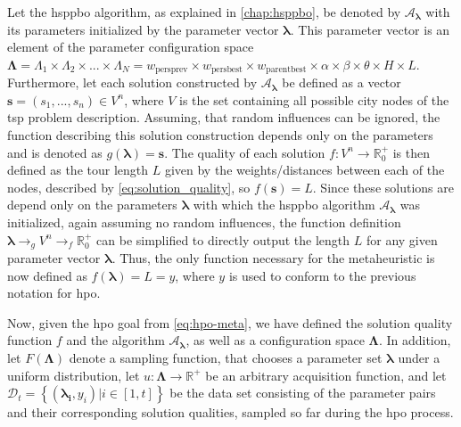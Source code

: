 Let the \gls{hsppbo} algorithm, as explained in \cref{chap:hsppbo}, be denoted by $\mathcal{A}_\mathbf{\lambda}$ with its parameters initialized by the parameter vector $\mathbf{\lambda}$. This parameter vector is an element of the parameter configuration space $\mathbf{\Lambda} = \Lambda_1 \times \Lambda_2 \times ... \times \Lambda_N = w_{\text{persprev}} \times w_{\text{persbest}} \times w_{\text{parentbest}} \times \alpha \times \beta \times \theta \times H \times L$. Furthermore, let each solution constructed by $\mathcal{A}_\mathbf{\lambda}$ be defined as a vector $\mathbf{s} = (s_1,...,s_n) \in V^n$, where $V$ is the set containing all possible city nodes of the \gls{tsp} problem description. Assuming, that random influences can be ignored, the function describing this solution construction depends only on the parameters and is denoted as $g(\mathbf{\lambda}) = \mathbf{s}$. The quality of each solution $f : V^n \rightarrow \mathbb{R}_{0}^{+}$ is then defined as the tour length $L$ given by the weights/distances between each of the nodes, described by \cref{eq:solution_quality}, so $f(\mathbf{s}) = L$. Since these solutions are depend only on the parameters $\mathbf{\lambda}$ with which the \gls{hsppbo} algorithm $\mathcal{A}_\mathbf{\lambda}$ was initialized, again assuming no random influences, the function definition  $\mathbf{\lambda} \to_{g} V^n \to_{f} \mathbb{R}_{0}^{+}$ can be simplified to directly output the length $L$ for any given parameter vector $\mathbf{\lambda}$. Thus, the only function necessary for the metaheuristic is now defined as $f(\mathbf{\lambda}) = L = y$, where $y$ is used to conform to the previous notation for \gls{hpo}.

Now, given the \glsdesc{hpo} goal from \cref{eq:hpo-meta}, we have defined the solution quality function $f$ and the algorithm $\mathcal{A}_\mathbf{\lambda}$, as well as a configuration space $\mathbf{\Lambda} $. In addition, let $F(\mathbf{\Lambda})$ denote a sampling function, that chooses a parameter set $\mathbf{\lambda}$ under a uniform distribution, let $u: \mathbf{\Lambda} \to \mathbb{R}^+$ be an arbitrary acquisition function, and let $\mathcal{D}_t = \left\lbrace (\mathbf{\lambda_i}, y_i) |  i\in [1,t] \right\rbrace $ be the data set consisting of the parameter pairs and their corresponding solution qualities, sampled so far during the \gls{hpo} process.

